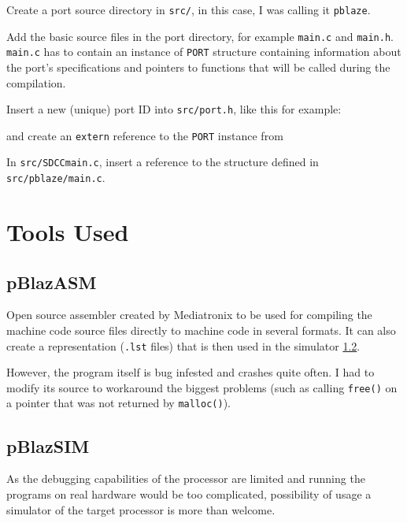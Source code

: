     Create a port source directory in \texttt{src/}, in this case, I was calling it \texttt{pblaze}.

    Add the basic source files in the port directory, for example \texttt{main.c} and \texttt{main.h}. \texttt{main.c} has to contain an instance of \texttt{PORT} structure containing information about the port's specifications and pointers to functions that will be called during the compilation.

    Insert a new (unique) port ID into \texttt{src/port.h}, like this for example:



    and create an \texttt{extern} reference to the \texttt{PORT} instance from %


    In \texttt{src/SDCCmain.c}, insert a reference to the structure defined in \texttt{src/pblaze/main.c}.

    

    \section{Tools Used}

        \subsection{pBlazASM}

        Open source assembler created by Mediatronix to be used for compiling the machine code source files directly to machine code in several formats. It can also create a representation (\texttt{.lst} files) that is then used in the simulator \ref{pblazsim}.

        However, the program itself is bug infested and crashes quite often. I had to modify its source to workaround the biggest problems (such as calling \texttt{free()} on a pointer that was not returned by \texttt{malloc()}).

        \subsection{pBlazSIM}\label{pblazsim}

        As the debugging capabilities of the processor are limited and running the programs on real hardware would be too complicated, possibility of usage a simulator of the target processor is more than welcome.

